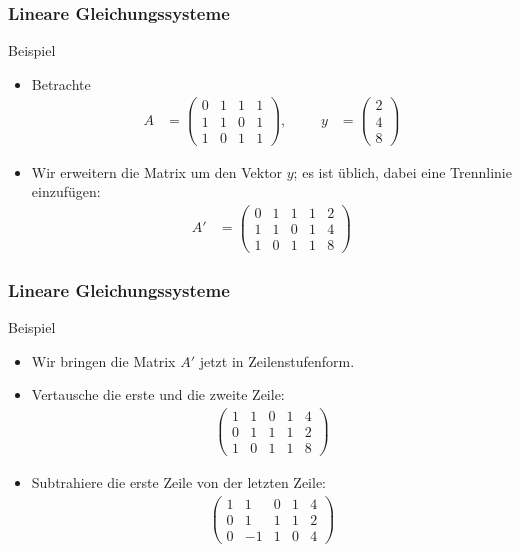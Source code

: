 \documentclass{beamer}
\newcommand\bc[1]{\left({#1}\right)}
\newcommand{\ue}{\"u}
\newcommand{\mytitle}{Lineare Gleichungssysteme}
\begin{document}
\begin{frame}\frametitle{\mytitle}
	\begin{block}{Beispiel}
	\begin{itemize}
		\item Betrachte 
			\begin{align*}
				A&=\begin{pmatrix}
					0&1&1&1\\1&1&0&1\\1&0&1&1
					\end{pmatrix},&&&y&=\begin{pmatrix} 2\\4\\8 \end{pmatrix}
			\end{align*}
		\item Wir erweitern die Matrix um den Vektor $y$; es ist \ue blich, dabei eine Trennlinie einzuf\ue gen:
			\begin{align*}
				A'&=\bc{\begin{array}{cccc|c} 0&1&1&1&2\\1&1&0&1&4\\1&0&1&1&8\end{array}}
			\end{align*}
	\end{itemize}
	\end{block}
\end{frame}

\begin{frame}\frametitle{\mytitle}
	\begin{block}{Beispiel}
		\begin{itemize}
			\item Wir bringen die Matrix $A'$ jetzt in Zeilenstufenform. 
			\item Vertausche die erste und die zweite Zeile:
				\begin{align*}
					\bc{\begin{array}{cccc|c}1&1&0&1&4\\0&1&1&1&2\\1&0&1&1&8\end{array}}
				\end{align*}
			\item Subtrahiere die erste Zeile von der letzten Zeile:
				\begin{align*}
					\bc{\begin{array}{cccc|c}1&1&0&1&4\\0&1&1&1&2\\0&-1&1&0&4\end{array}}
				\end{align*}
		\end{itemize}
	\end{block}
\end{frame}
\end{document}
